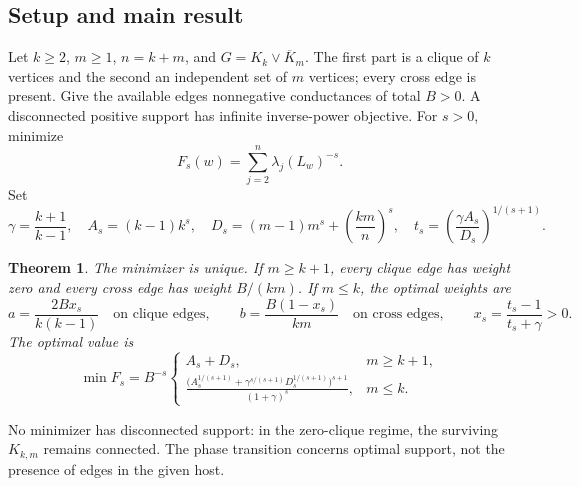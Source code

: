 \documentclass[11pt,a4paper]{article}
\newtheorem{theorem}{Theorem}[section]
\theoremstyle{definition}\newtheorem{definition}[theorem]{Definition}
\theoremstyle{remark}\newtheorem{remark}[theorem]{Remark}
\numberwithin{equation}{section}
\begin{document}
\subsection{Setup and main result}\label{T03-sec-1}
Let $k\ge2$, $m\ge1$, $n=k+m$, and $G=K_k\vee\overline K_m$. The first part is a clique of $k$ vertices and the second an independent set of $m$ vertices; every cross edge is present. Give the available edges nonnegative conductances of total $B>0$. A disconnected positive support has infinite inverse-power objective. For $s>0$, minimize
\[
 F_s(w)=\sum_{j=2}^n\lambda_j(L_w)^{-s}.
\]
Set
\[
 \gamma=\frac{k+1}{k-1},\quad A_s=(k-1)k^s,\quad
 D_s=(m-1)m^s+\left(\frac{km}{n}\right)^s,
 \quad t_s=\left(\frac{\gamma A_s}{D_s}\right)^{1/(s+1)}.
\]
\begin{theorem}\label{T03-thm:main}
The minimizer is unique. If $m\ge k+1$, every clique edge has weight zero and every cross edge has weight $B/(km)$. If $m\le k$, the optimal weights are
\begin{equation}\label{T03-eq:weights}
 a=\frac{2Bx_s}{k(k-1)}\quad\text{on clique edges},\qquad
 b=\frac{B(1-x_s)}{km}\quad\text{on cross edges},
 \qquad x_s=\frac{t_s-1}{t_s+\gamma}>0.
\end{equation}
The optimal value is
\begin{equation}\label{T03-eq:min}
 \min F_s=B^{-s}
 \begin{cases}
 A_s+D_s,&m\ge k+1,\\[2mm]
 \displaystyle\frac{\big(A_s^{1/(s+1)}+\gamma^{s/(s+1)}D_s^{1/(s+1)}\big)^{s+1}}
 {(1+\gamma)^s},&m\le k.
 \end{cases}
\end{equation}
\end{theorem}
No minimizer has disconnected support: in the zero-clique regime, the surviving $K_{k,m}$ remains connected. The phase transition concerns optimal support, not the presence of edges in the given host.
\end{document}
